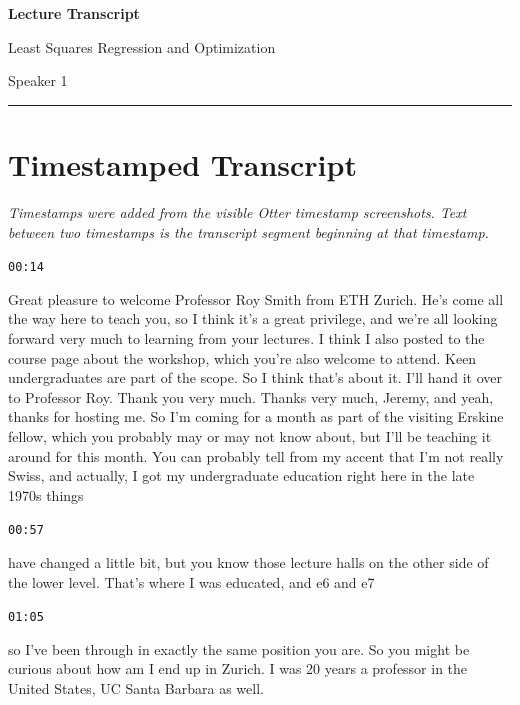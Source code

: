 \documentclass[11pt,a4paper]{article}
\newcommand{\timestamp}[1]{%
  \par\vspace{0.35em}%
  \noindent\colorbox{timestampback}{\textcolor{timestampblue}{\small\texttt{#1}}}%
  \par\vspace{0.2em}%
}
\begin{document}
\begin{center}
    {\LARGE\bfseries Lecture Transcript}\par
    \vspace{0.35em}
    {\large Least Squares Regression and Optimization}\par
    \vspace{0.6em}
    {\normalsize Speaker 1}\par
\end{center}

\vspace{0.5em}
\hrule
\vspace{1.2em}

\section*{Timestamped Transcript}

\textit{Timestamps were added from the visible Otter timestamp screenshots. Text between two timestamps is the transcript segment beginning at that timestamp.}

\timestamp{00:14}

Great pleasure to welcome Professor Roy Smith from ETH Zurich. He's come all the way here to teach you, so I think it's a great privilege, and we're all looking forward very much to learning from your lectures. I think I also posted to the course page about the workshop, which you're also welcome to attend. Keen undergraduates are part of the scope. So I think that's about it. I'll hand it over to Professor Roy. Thank you very much. Thanks very much, Jeremy, and yeah, thanks for hosting me. So I'm coming for a month as part of the visiting Erskine fellow, which you probably may or may not know about, but I'll be teaching it around for this month. You can probably tell from my accent that I'm not really Swiss, and actually, I got my undergraduate education right here in the late 1970s things



\timestamp{00:57}

have changed a little bit, but you know those lecture halls on the other side of the lower level. That's where I was educated, and e6 and e7



\timestamp{01:05}

so I've been through in exactly the same position you are. So you might be curious about how am I end up in Zurich. I was 20 years a professor in the United States, UC Santa Barbara as well.
\end{document}
